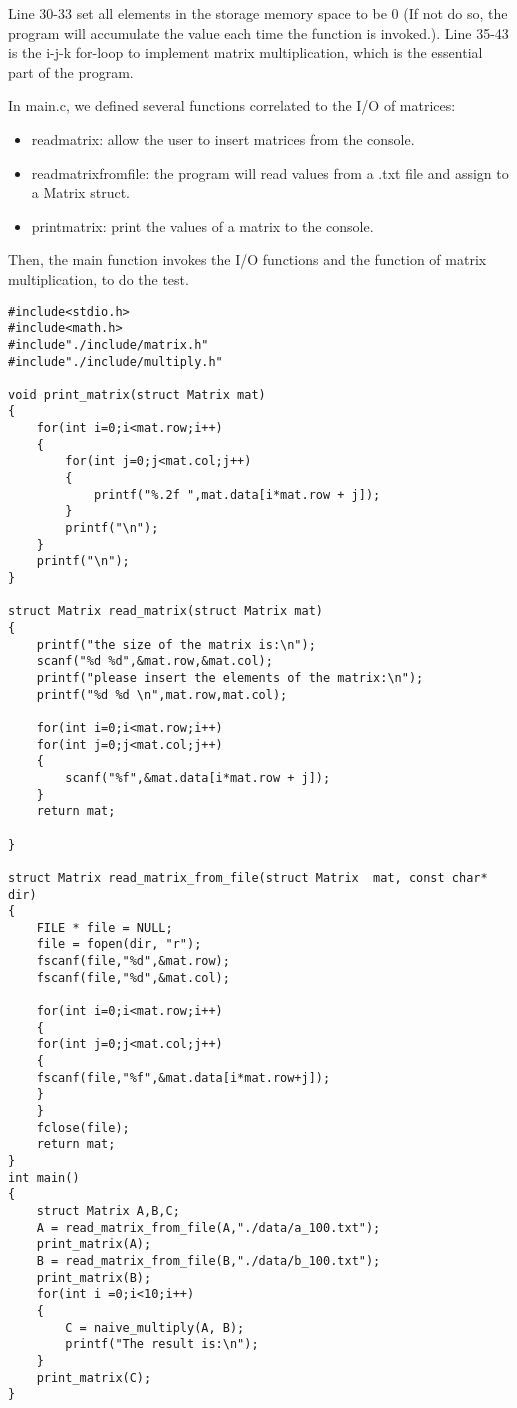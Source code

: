 \documentclass[12pt]{article}
\begin{document}
	Line 30-33 set all elements in the storage memory space to be 0 (If not do so, the program will accumulate the value each time the function is invoked.). Line 35-43 is the i-j-k for-loop to implement matrix multiplication, which is the essential part of the program.\\\par
	In main.c, we defined several functions correlated to the I/O of matrices: 
	\begin{itemize}
		\item read\underline{\:}matrix: allow the user to insert matrices from the console.
		\item read\underline{\:}matrix\underline{\:}from\underline{\:}file: the program will read values from a .txt file and assign to a Matrix struct.
		\item print\underline{\:}matrix: print the values of a matrix to the console.
	\end{itemize}\par
	Then, the main function invokes the I/O functions and the function of matrix multiplication, to do the test.
	\begin{lstlisting}[title=main.c]
#include<stdio.h>
#include<math.h>
#include"./include/matrix.h"
#include"./include/multiply.h"

void print_matrix(struct Matrix mat)
{
	for(int i=0;i<mat.row;i++)
	{
		for(int j=0;j<mat.col;j++)
		{
			printf("%.2f ",mat.data[i*mat.row + j]);
		}
		printf("\n");
	}
	printf("\n");
}

struct Matrix read_matrix(struct Matrix mat)
{
	printf("the size of the matrix is:\n");
	scanf("%d %d",&mat.row,&mat.col);
	printf("please insert the elements of the matrix:\n");
	printf("%d %d \n",mat.row,mat.col);
	
	for(int i=0;i<mat.row;i++)
	for(int j=0;j<mat.col;j++)
	{
		scanf("%f",&mat.data[i*mat.row + j]);
	}
	return mat;
	
}

struct Matrix read_matrix_from_file(struct Matrix  mat, const char* dir)
{
	FILE * file = NULL;
	file = fopen(dir, "r");
	fscanf(file,"%d",&mat.row);
	fscanf(file,"%d",&mat.col);
	
	for(int i=0;i<mat.row;i++)
	{
	for(int j=0;j<mat.col;j++)
	{          
	fscanf(file,"%f",&mat.data[i*mat.row+j]);
	}
	}	
	fclose(file);
	return mat;
}
int main()
{   
	struct Matrix A,B,C;
	A = read_matrix_from_file(A,"./data/a_100.txt");
	print_matrix(A);
	B = read_matrix_from_file(B,"./data/b_100.txt");
	print_matrix(B);
	for(int i =0;i<10;i++)
	{
		C = naive_multiply(A, B);
		printf("The result is:\n");
	}
	print_matrix(C);
}

	\end{lstlisting}\par
\end{document}
